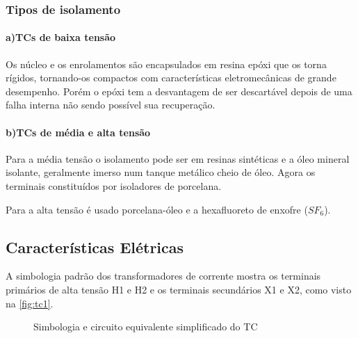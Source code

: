 \documentclass[a5paper,english,spanish,brazil]{ufsc-thesis}
\begin{document}
			\subsubsection{Tipos de isolamento}
				\paragraph*{a)\indent TCs de baixa tensão}
					Os núcleo e os enrolamentos são encapsulados em resina epóxi que os torna rígidos, tornando-os compactos com características eletromecânicas de grande desempenho. Porém o epóxi tem a desvantagem de ser descartável depois de uma falha interna não sendo possível sua recuperação.
				\paragraph*{b)\indent TCs de média e alta tensão}
					Para a média tensão o isolamento pode ser em resinas sintéticas e a óleo mineral isolante, geralmente imerso num tanque metálico cheio de óleo. Agora os terminais constituídos por isoladores de porcelana.\par
					Para a alta tensão é usado porcelana-óleo e a hexafluoreto de enxofre ($SF_6$).\par

		\subsection{Características Elétricas}
			A simbologia padrão dos transformadores de corrente mostra os terminais primários de alta tensão H1 e H2 e os terminais secundários X1 e X2, como visto na \autoref{fig:tc1}.

			\begin{figure}[htb]
				\caption{Simbologia e circuito equivalente simplificado do TC}
				\centering
			\end{figure}
			
\end{document}
